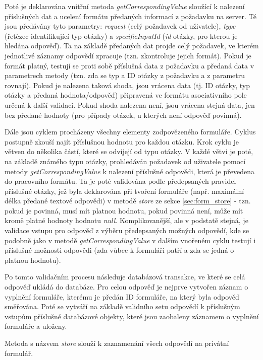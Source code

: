 			Poté je deklarována vnitřní metoda \textit{getCorrespondingValue} sloužící k nalezení příslušných dat a ucelení formátu předaných informací z požadavku na server. Té jsou předávány tyto parametry: \textit{request} (celý požadavek od uživatele), \textit{type} (řetězec identifikující typ otázky) a \textit{specificInputId} (\textit{id} otázky, pro kterou je hledána odpověď). Ta na základě předaných dat projde celý požadavek, ve kterém jednotlivé záznamy odpovědí zpracuje (tzn. zkontroluje jejich formát). Pokud je formát platný, testují se proti sobě příslušná data z požadavku a předaná data v parametrech metody (tzn. zda se typ a ID otázky z požadavku a z parametru rovnají). Pokud je nalezena taková shoda, jsou vrácena data (tj. ID otázky, typ otázky a předaná hodnota/odpověď) připravená ve formátu asociativního pole určená k další validaci. Pokud shoda nalezena není, jsou vrácena stejná data, jen bez předané hodnoty (pro případy otázek, u kterých není odpověď povinná).
			
			Dále jsou cyklem procházeny všechny elementy zodpovězeného formuláře. Cyklus postupně zkouší najít příslušnou hodnotu pro každou otázku. Krok cyklu je větven do několika částí, které se odvíjejí od typu otázky. V každé větvi je poté, na základě známého typu otázky, prohledáván požadavek od uživatele pomocí metody \textit{getCorrespondingValue} k nalezení příslušné odpovědi, která je převedena do pracovního formátu. Ta je poté validována podle předepsaných pravidel příslušné otázky, jež byla deklarována při tvoření formuláře (např. maximální délka předané textové odpovědi) v metodě \textit{store} ze sekce \ref{sec:form_store} - tzn. pokud je povinná, musí mít platnou hodnotu, pokud povinná není, může mít kromě platné hodnoty hodnotu \textit{null}. Komplikovanější, ale v podstatě stejná, je validace vstupu pro odpověď z výběru předepsaných možných odpovědí, kde se podobně jako v metodě \textit{getCorrespondingValue} v dalším vnořeném cyklu testují i příslušné možnosti odpovědi (zda vůbec k formuláři patří a zda se jedná o platnou hodnotu).
			
			Po tomto validačním procesu následuje databázová transakce, ve které se celá odpověď ukládá do databáze. Pro celou odpověď je nejprve vytvořen záznam o vyplnění formuláře, kterému je předán ID formuláře, na který byla odpověď směřována. Poté se vytváří na základě validního setu odpovědí k příslušným vstupům příslušné databázové objekty, které jsou zaobaleny záznamem o vyplnění formuláře a uloženy.
			
			\label{sec:form_comp_private}
			Metoda s názvem \textit{store} slouží k zaznamenání všech odpovědí na privátní formulář.
			
